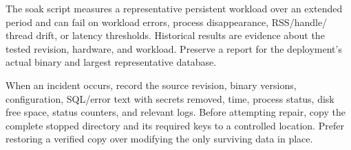 The soak script measures a representative persistent workload over an extended
period and can fail on workload errors, process disappearance, RSS/handle/
thread drift, or latency thresholds. Historical results are evidence about
the tested revision, hardware, and workload. Preserve a report for the
deployment's actual binary and largest representative database.

When an incident occurs, record the source revision, binary versions,
configuration, SQL/error text with secrets removed, time, process status,
disk free space, status counters, and relevant logs. Before attempting repair,
copy the complete stopped directory and its required keys to a controlled
location. Prefer restoring a verified copy over modifying the only surviving
data in place.

